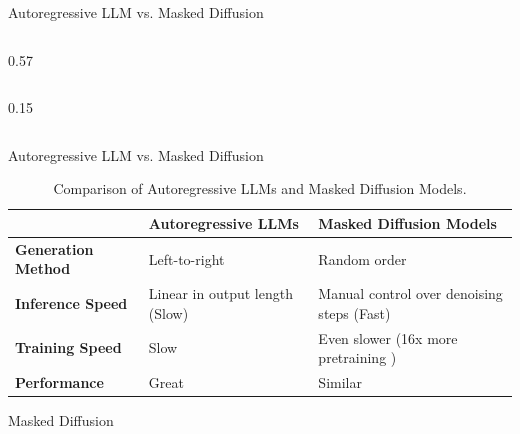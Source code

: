 \documentclass[normaltitle,first=orange,second=red,leqno]{aaltoslides}
\newcommand{\thesiscolor}{orange}
\begin{document}
\begin{frame}{Autoregressive LLM vs. Masked Diffusion}
\begin{columns}[T]
\begin{column}{0.57\textwidth}
\begin{columns}[T]
                
                \begin{column}{0.15\textwidth}
                    \centering
                    \vspace{1.2cm}
                \end{column}
            \end{columns}
        \end{column}
        
    \end{columns}
\end{frame}

\begin{frame}{Autoregressive LLM vs. Masked Diffusion}
    \begin{table}
        \centering
        \caption{Comparison of Autoregressive LLMs and Masked Diffusion Models.}
        \begin{tabular}{|p{}|p{}|p{}|}
            \hline
             & \textbf{Autoregressive LLMs} & \textbf{Masked Diffusion Models} \\
            \hline\hline
            \textbf{Generation Method} & Left-to-right & Random order \\
            \hline
            \textbf{Inference Speed} & Linear in output length (Slow) & Manual control over denoising steps (Fast) \\
            \hline
            \textbf{Training Speed} & Slow & Even slower (16x more pretraining \cite{nie2025scalingmaskeddiffusionmodels}) \\
            \hline
            \textbf{Performance} & Great & Similar \\
            \hline
        \end{tabular}
    \end{table}
\end{frame}

\begin{frame}
\begin{center}
\Huge{\color{\thesiscolor} Masked Diffusion}
\end{center}
\end{frame}
\end{document}
